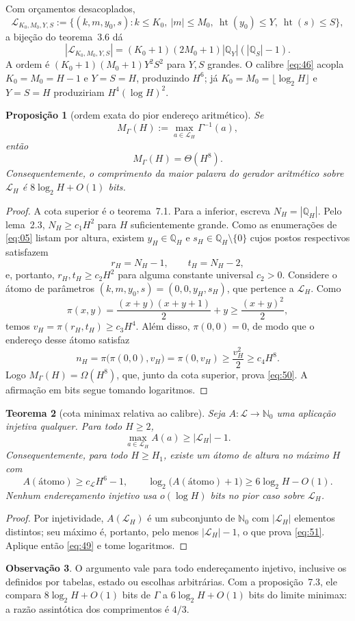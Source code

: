 \documentclass[11pt,a4paper]{article}
\theoremstyle{preciso}
\newtheorem{teorema}{Teorema}[section]
\newtheorem{proposicao}[teorema]{Proposição}
\theoremstyle{definition}
\newtheorem{observacao}[teorema]{Observação}
\newcommand{\N}{\mathbb N}
\newcommand{\Q}{\mathbb Q}
\newcommand{\LL}{\mathcal L}
\newcommand{\heightq}{\operatorname{ht}}
\newcommand{\eqn}[2]{\begin{equation}\label{eq:#1}#2\end{equation}}
\begin{document}
Com orçamentos desacoplados,
\[
\LL_{K_0,M_0,Y,S}:=\{(k,m,y_0,s):k\le K_0,\ |m|\le M_0,\ \heightq(y_0)\le Y,\ \heightq(s)\le S\},
\]
a bijeção do teorema~3.6 dá
\[
|\LL_{K_0,M_0,Y,S}|=(K_0+1)(2M_0+1)|\Q_Y|(|\Q_S|-1).
\]
A ordem é $(K_0+1)(M_0+1)Y^2S^2$ para $Y,S$ grandes. O calibre \eqref{eq:46} acopla $K_0=M_0=H-1$ e $Y=S=H$, produzindo $H^6$; já $K_0=M_0=\lfloor\log_2H\rfloor$ e $Y=S=H$ produziriam $H^4(\log H)^2$.

\begin{proposicao}[ordem exata do pior endereço aritmético]
Se
\[
M_\Gamma(H):=\max_{a\in\LL_H}\Gamma^{-1}(a),
\]
então
\eqn{50}{M_\Gamma(H)=\Theta(H^8).}
Consequentemente, o comprimento da maior palavra do gerador aritmético sobre $\LL_H$ é $8\log_2H+O(1)$ bits.
\end{proposicao}
\begin{proof}
A cota superior é o teorema~7.1. Para a inferior, escreva $N_H=|\Q_H|$. Pelo lema~2.3, $N_H\ge c_1H^2$ para $H$ suficientemente grande. Como as enumerações de \eqref{eq:05} listam por altura, existem $y_H\in\Q_H$ e $s_H\in\Q_H\setminus\{0\}$ cujos postos respectivos satisfazem
\[
r_H=N_H-1,\qquad t_H=N_H-2,
\]
e, portanto, $r_H,t_H\ge c_2H^2$ para alguma constante universal $c_2>0$. Considere o átomo de parâmetros $(k,m,y_0,s)=(0,0,y_H,s_H)$, que pertence a $\LL_H$. Como
\[
\pi(x,y)=\frac{(x+y)(x+y+1)}2+y\ge\frac{(x+y)^2}2,
\]
temos $v_H=\pi(r_H,t_H)\ge c_3H^4$. Além disso, $\pi(0,0)=0$, de modo que o endereço desse átomo satisfaz
\[
n_H=\pi\bigl(\pi(0,0),v_H\bigr)=\pi(0,v_H)\ge\frac{v_H^2}2\ge c_4H^8.
\]
Logo $M_\Gamma(H)=\Omega(H^8)$, que, junto da cota superior, prova \eqref{eq:50}. A afirmação em bits segue tomando logaritmos.
\end{proof}

\begin{teorema}[cota minimax relativa ao calibre]
Seja $A:\LL\to\N_0$ uma aplicação injetiva qualquer. Para todo $H\ge2$,
\eqn{51}{\max_{a\in\LL_H}A(a)\ge|\LL_H|-1.}
Consequentemente, para todo $H\ge H_1$, existe um átomo de altura no máximo $H$ com
\eqn{52}{A(\text{átomo})\ge c_{\LL}H^6-1,\qquad
\log_2\bigl(A(\text{átomo})+1\bigr)\ge6\log_2H-O(1).}
Nenhum endereçamento injetivo usa $o(\log H)$ bits no pior caso sobre $\LL_H$.
\end{teorema}
\begin{proof}
Por injetividade, $A(\LL_H)$ é um subconjunto de $\N_0$ com $|\LL_H|$ elementos distintos; seu máximo é, portanto, pelo menos $|\LL_H|-1$, o que prova \eqref{eq:51}. Aplique então \eqref{eq:49} e tome logaritmos.
\end{proof}
\begin{observacao}
O argumento vale para todo endereçamento injetivo, inclusive os definidos por tabelas, estado ou escolhas arbitrárias. Com a proposição~7.3, ele compara $8\log_2H+O(1)$ bits de $\Gamma$ a $6\log_2H+O(1)$ bits do limite minimax: a razão assintótica dos comprimentos é $4/3$.
\end{observacao}
\end{document}

